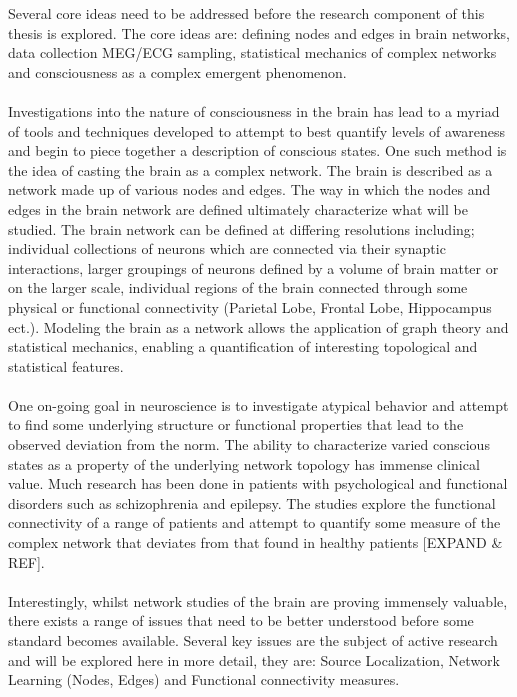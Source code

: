 \documentclass{article}
\begin{document}
Several core ideas need to be addressed before the research component of this thesis is explored. The core ideas are: defining nodes and edges in brain networks, data collection MEG/ECG sampling, statistical mechanics of complex networks and consciousness as a complex emergent phenomenon.\\
\\
Investigations into the nature of consciousness in the brain has lead to a myriad of tools and techniques developed to attempt to best quantify levels of awareness and begin to piece together a description of conscious states. One such method is the idea of casting the brain as a complex network. The brain is described as a network made up of various nodes and edges. The way in which the nodes and edges in the brain network are defined ultimately characterize what will be studied. The brain network can be defined at differing resolutions including; individual collections of neurons which are connected via their synaptic interactions, larger groupings of neurons defined by a volume of brain matter or on the larger scale, individual regions of the brain connected through some physical or functional connectivity (Parietal Lobe, Frontal Lobe, Hippocampus ect.). Modeling the brain as a network allows the application of graph theory and statistical mechanics, enabling a quantification of interesting topological and statistical features.\\
\\
One on-going goal in neuroscience is to investigate atypical behavior and attempt to find some underlying structure or functional properties that lead to the observed deviation from the norm. The ability to characterize varied conscious states as a property of the underlying network topology has immense clinical value. Much research has been done in patients with psychological and functional disorders such as schizophrenia and epilepsy. The studies explore the functional connectivity of a range of patients and attempt to quantify some measure of the complex network that deviates from that found in healthy patients [EXPAND \& REF].\\
\\
Interestingly, whilst network studies of the brain are proving immensely valuable, there exists a range of issues that need to be better understood before some standard becomes available. Several key issues are the subject of active research and will be explored here in more detail, they are: Source Localization, Network Learning (Nodes, Edges) and Functional connectivity measures.  
\end{document}
